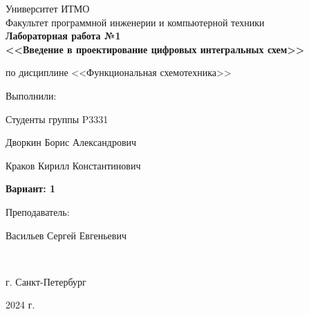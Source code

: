 \begin{center}
	\vspace{1cm}
	\large{Университет ИТМО}\\
	\large{Факультет программной инженерии и компьютерной техники}\\
	\vspace{4cm}
	\Large{\textbf{Лабораторная работа №1\\}}
	\vspace{0.3cm}
	\large{\textbf{<<Введение в проектирование цифровых интегральных схем>>\\}}
	\vspace{-0.3cm}
	\begin{center}
		\large{по дисциплине <<Функциональная схемотехника>>}
	\end{center}
	\vspace{3cm}
\end{center}
\normalsize{
	\begin{flushright}
		Выполнили:
		\par
		Студенты группы P3331
		\par
		Дворкин Борис Александрович
		\par
		Краков Кирилл Константинович
		\par
		\textbf{Вариант: 1}
		\par
		\vspace{1cm}
		Преподаватель:
		\par
		Васильев Сергей Евгеньевич
	\end{flushright}
}\\
\vspace{6cm}
\begin{center} г. Санкт-Петербург
	\par
	2024 г.
\end{center}
